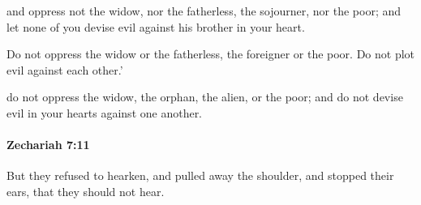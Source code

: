 			\begin{versebox}
					\item[BHS] 
					\item[LXX] 
					\item[ASV] and oppress not the widow, nor the fatherless, the sojourner, nor the poor; and let none of you devise evil against his brother in your heart.
					\item[NIV] Do not oppress the widow or the fatherless, the foreigner or the poor. Do not plot evil against each other.’
					\item[NRSV] do not oppress the widow, the orphan, the alien, or the poor; and do not devise evil in your hearts against one another.
			\end{versebox}

		\paragraph{Zechariah 7:11} %
			\label{ZECHARIAH-7-11}

			But they refused to hearken, and pulled away the shoulder, and stopped their ears, that they should not hear.

